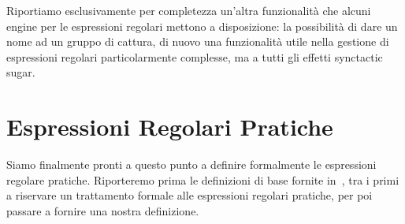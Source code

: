 Riportiamo esclusivamente per completezza un'altra funzionalità che alcuni engine per le espressioni regolari mettono a disposizione: la possibilità di dare un nome ad un gruppo di cattura, di nuovo una funzionalità utile nella gestione di espressioni regolari particolarmente complesse, ma a tutti gli effetti synctactic sugar.

\section{Espressioni Regolari Pratiche}
Siamo finalmente pronti a questo punto a definire formalmente le espressioni regolare pratiche. Riporteremo prima le definizioni di base fornite in~\cite{campeanu:formal_study}, tra i primi a riservare un trattamento formale alle espressioni regolari pratiche, per poi passare a fornire una nostra definizione.

